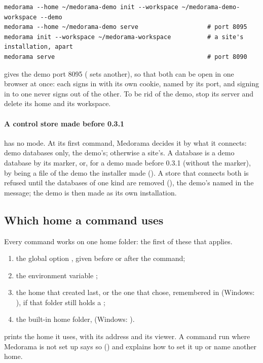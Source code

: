 \begin{lstlisting}[style=shell]
medorama --home ~/medorama-demo init --workspace ~/medorama-demo-workspace --demo
medorama --home ~/medorama-demo serve                   # port 8095
medorama init --workspace ~/medorama-workspace          # a site's installation, apart
medorama serve                                          # port 8090
\end{lstlisting}
 gives the demo port 8095 ( sets another), so that both can be
open in one browser at once: each signs in with its own cookie, named by its port, and signing
in to one never signs out of the other. To be rid of the demo, stop its server and delete its home and its workspace.

\paragraph{A control store made before 0.3.1} has no mode. At its first command, Medorama decides
it by what it connects: demo databases only, the demo's; otherwise a site's. A database is a demo
database by its marker, or, for a demo made before 0.3.1 (without the marker), by being a file
of the demo the installer made (). A store that connects both
is refused until the databases of one kind are removed (),
the demo's named in the message; the demo is then made as its own installation.

\subsection{Which home a command uses}
\label{sec:administration-which}

Every command works on one home folder: the first of these that applies.
\begin{enumerate}
\item the global option , given before or after the command;
\item the environment variable ;
\item the home that  created last, or the one that 
  chose, remembered in  (Windows:
  ), if that folder still holds a
  ;
\item the built-in home folder,  (Windows:
  ).
\end{enumerate}
 prints the home it uses, with its address and its viewer. A command run
where Medorama is not set up says so () and explains how to
set it up or name another home.

